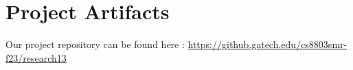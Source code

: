 \documentclass{article}
\begin{document}
\section{Project Artifacts}
Our project repository can be found here : \url{https://github.gatech.edu/cs8803smr-f23/research13}

\printbibliography

% 






\end{document}
